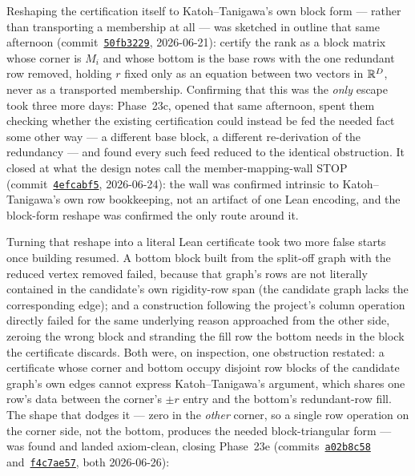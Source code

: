 Reshaping the certification itself to Katoh--Tanigawa's own block form ---
rather than transporting a membership at all --- was sketched in outline
that same afternoon
(commit~\href{https://github.com/bryangingechen/CombinatorialRigidity/commit/50fb322968bf7ade9596de46b958a80c1fdde3b7}{\texttt{50fb3229}},
2026-06-21): certify the rank as a block matrix whose corner is $M_i$ and
whose bottom is the base rows with the one redundant row removed, holding
$r$ fixed only as an equation between two vectors in ${\mathbb{R}}^D$, never as a
transported membership. Confirming that this was the \emph{only} escape
took three more days: Phase~23c, opened that same afternoon, spent them
checking whether the existing certification could instead be fed the
needed fact some other way --- a different base block, a different
re-derivation of the redundancy --- and found every such feed reduced to
the identical obstruction. It closed at what the design notes call the
member-mapping-wall STOP
(commit~\href{https://github.com/bryangingechen/CombinatorialRigidity/commit/4efcabf5f8611bcc88aceea701a735eca8c45ba1}{\texttt{4efcabf5}},
2026-06-24): the wall was confirmed intrinsic to Katoh--Tanigawa's own row
bookkeeping, not an artifact of one Lean encoding, and the block-form
reshape was confirmed the only route around it.

Turning that reshape into a literal Lean certificate took two more false
starts once building resumed. A bottom block built from the split-off graph
with the reduced vertex removed failed, because that graph's rows are not
literally contained in the candidate's own rigidity-row span (the candidate
graph lacks the corresponding edge); and a construction following the
project's column operation directly failed for the same underlying reason
approached from the other side, zeroing the wrong block and stranding the
fill row the bottom needs in the block the certificate discards. Both were,
on inspection, one obstruction restated: a certificate whose corner and
bottom occupy disjoint row blocks of the candidate graph's own edges cannot
express Katoh--Tanigawa's argument, which shares one row's data between the
corner's $\pm r$ entry and the bottom's redundant-row fill. The shape that
dodges it --- zero in the \emph{other} corner, so a single row operation on
the corner side, not the bottom, produces the needed block-triangular form
--- was found and landed axiom-clean, closing Phase~23e
(commits~\href{https://github.com/bryangingechen/CombinatorialRigidity/commit/a02b8c58807768cb967eba57d78d3c3bc61fb2fd}{\texttt{a02b8c58}}
and~\href{https://github.com/bryangingechen/CombinatorialRigidity/commit/f4c7ae579969cb3634ec4789daad3cfa3c823c41}{\texttt{f4c7ae57}},
both 2026-06-26):


